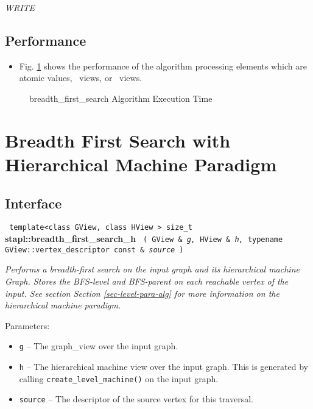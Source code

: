 \textit{WRITE}

\subsection{Performance} \label{sec-br-first-alg-perf}

\begin{itemize}
\item
Fig. \ref{fig:br-first-alg-exec-exper}
shows the performance of the algorithm processing
elements which are atomic values, \stl\ views, or \stapl\ views.
\end{itemize}

\begin{figure}[p]
\caption{breadth\_first\_search Algorithm Execution Time}
\label{fig:br-first-alg-exec-exper}
\end{figure}


\section{ Breadth First Search with Hierarchical Machine Paradigm} 
\label{sec-br-first-hmach-alg}

\subsection{Interface} \label{sec-br-first-hmach-alg-inter}

\noindent
\texttt{%
template<class GView, class HView >
\newline
size\_t 
}
\newline
\textbf{stapl::breadth\_first\_search\_h}%
\newline
\texttt{%
(   
GView \&    
\textit{g,}%
HView \&    
\textit{h,}%
typename GView::vertex\_descriptor const \&
\textit{source}%
)     
}
\vspace{0.4cm}

\textit{
Performs a breadth-first search on the input graph and its hierarchical machine Graph.
Stores the BFS-level and BFS-parent on each reachable vertex of the input.
See section
Section \ref{sec-level-para-alg}
for more information on the hierarchical machine paradigm.
}
\vspace{0.4cm}

Parameters:
\begin{itemize}
\item
\texttt{g} --
The graph\_view over the input graph.
\item
\texttt{h} --
The hierarchical machine view over the input graph. This is generated by calling
\texttt{create\_level\_machine()}%
 on the input graph.
\item
\texttt{source} --
The descriptor of the source vertex for this traversal.
\end{itemize}

